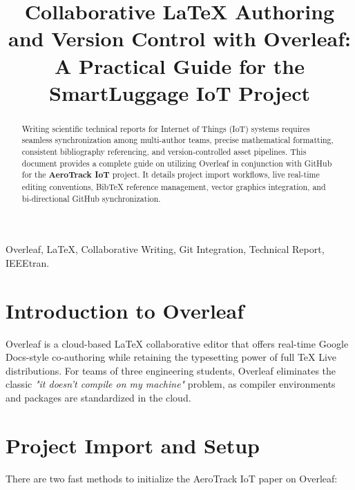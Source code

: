 \documentclass[conference]{IEEEtran}
\begin{document}
\title{Collaborative LaTeX Authoring and Version Control with Overleaf: A Practical Guide for the SmartLuggage IoT Project}

\author{
}

\maketitle

\begin{abstract}
Writing scientific technical reports for Internet of Things (IoT) systems requires seamless synchronization among multi-author teams, precise mathematical formatting, consistent bibliography referencing, and version-controlled asset pipelines. This document provides a complete guide on utilizing Overleaf in conjunction with GitHub for the \textbf{AeroTrack IoT} project. It details project import workflows, live real-time editing conventions, BibTeX reference management, vector graphics integration, and bi-directional GitHub synchronization.
\end{abstract}

\begin{IEEEkeywords}
Overleaf, LaTeX, Collaborative Writing, Git Integration, Technical Report, IEEEtran.
\end{IEEEkeywords}

\section{Introduction to Overleaf}
Overleaf is a cloud-based LaTeX collaborative editor that offers real-time Google Docs-style co-authoring while retaining the typesetting power of full TeX Live distributions. For teams of three engineering students, Overleaf eliminates the classic \textit{"it doesn't compile on my machine"} problem, as compiler environments and packages are standardized in the cloud.

\section{Project Import and Setup}
There are two fast methods to initialize the AeroTrack IoT paper on Overleaf:
\end{document}
